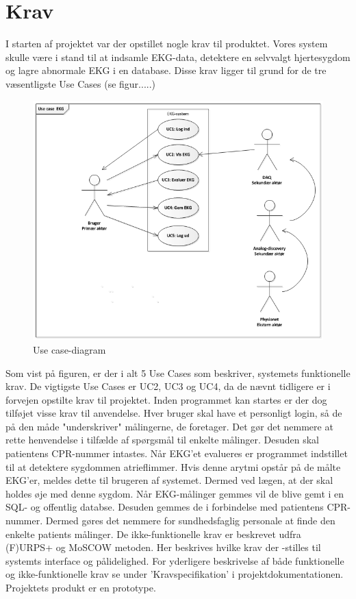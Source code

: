 \chapter{Krav}
I starten af projektet var der opstillet nogle krav til produktet. Vores system skulle være i stand til at indsamle EKG-data, detektere en selvvalgt hjertesygdom og lagre abnormale EKG i en database. Disse krav ligger til grund for de tre væsentligste Use Cases (se figur.....)

\begin{figure}[htb]
	\centering
	\includegraphics[width=1\textwidth]{Figurer/Snip20150518_11}
	\caption{Use case-diagram}
	\label{fig:Use Cases}
\end{figure}

Som vist på figuren, er der i alt 5 Use Cases som beskriver, systemets funktionelle krav. De vigtigste Use Cases er UC2, UC3 og UC4, da de nævnt tidligere er i forvejen opstilte krav til projektet. Inden programmet kan startes er der dog tilføjet visse krav til anvendelse. Hver bruger skal have et personligt login, så de på den måde "underskriver" målingerne, de foretager. Det gør det nemmere at rette henvendelse i tilfælde af spørgsmål til enkelte målinger. Desuden skal patientens CPR-nummer intastes.
Når EKG'et evalueres er programmet indstillet til at detektere sygdommen atrieflimmer. Hvis denne arytmi opstår på de målte EKG'er, meldes dette til brugeren af systemet. Dermed ved lægen, at der skal holdes øje med denne sygdom.
Når EKG-målinger gemmes vil de blive gemt i en SQL- og offentlig databse. Desuden gemmes de i forbindelse med patientens CPR-nummer. Dermed gøres det nemmere for sundhedsfaglig personale at finde den enkelte patients målinger.
De ikke-funktionelle krav er beskrevet udfra (F)URPS+ og MoSCOW metoden. Her beskrives hvilke krav der -stilles til systemts interface og pålidelighed.
For yderligere beskrivelse af både funktionelle og ikke-funktionelle krav se under 'Kravspecifikation' i projektdokumentationen.\\
Projektets produkt er en prototype. 